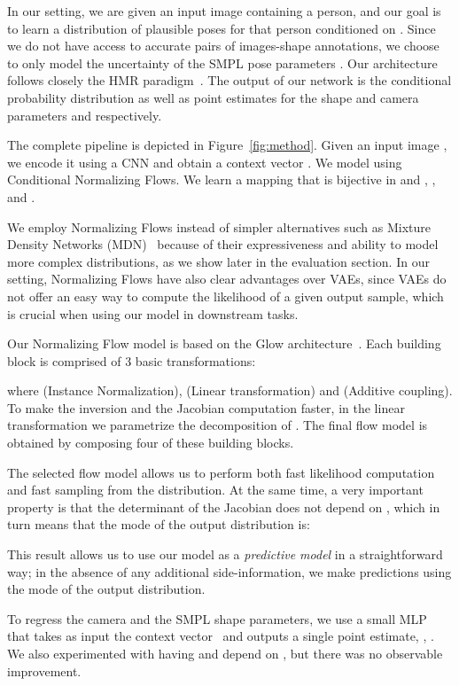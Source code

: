 In our setting, we are given an input image  containing a person, and our goal is to learn a distribution of plausible poses for that person conditioned on . Since we do not have access to accurate pairs of images-shape annotations, we choose to only model the uncertainty of the SMPL pose parameters . Our architecture follows closely the HMR paradigm~\cite{kanazawa2018end}. The output of our network is the conditional probability distribution  as well as point estimates for the shape and camera parameters  and  respectively.

The complete pipeline is depicted in Figure~\ref{fig:method}. 
Given an input image , we encode it using a CNN  and obtain a context vector .  We model  using Conditional Normalizing Flows. We learn a mapping  that is bijective in  and , \ie,  and .

We employ Normalizing Flows instead of simpler alternatives such as Mixture Density Networks (MDN)~\cite{li2019cvpr} because of their expressiveness and ability to model more complex distributions, as we show later in the evaluation section. In our setting, Normalizing Flows have also clear advantages over VAEs, since VAEs do not offer an easy way to compute the likelihood of a given output sample, which is crucial when using our model in downstream tasks.

Our Normalizing Flow model is based on the Glow architecture~\cite{kingma2018glow}. Each building block  is comprised of 3 basic transformations:

where  (Instance Normalization),  (Linear transformation) and  (Additive coupling). To make the inversion and the Jacobian computation faster, in the linear transformation we parametrize the  decomposition of . The final flow model is obtained by composing four of these building blocks.

The selected flow model allows us to perform both fast likelihood computation and fast sampling from the distribution. At the same time, a very important property is that the determinant of the Jacobian does not depend on , which in turn means that the mode of the output distribution is:

This result allows us to use our model as a \emph{predictive model} in a straightforward way; in the absence of any additional side-information, we make predictions using the mode of the output distribution.

To regress the camera and the SMPL shape parameters, we use a small MLP  that takes as input the context vector~ and outputs a single point estimate, \ie, . We also experimented with having  and  depend on , but there was no observable improvement.

